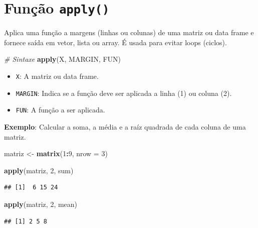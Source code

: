 \documentclass[
]{book}
\newenvironment{Shaded}{\begin{snugshade}}{\end{snugshade}}
\newcommand{\AttributeTok}[1]{\textcolor[rgb]{0.13,0.29,0.53}{#1}}
\newcommand{\CommentTok}[1]{\textcolor[rgb]{0.56,0.35,0.01}{\textit{#1}}}
\newcommand{\DecValTok}[1]{\textcolor[rgb]{0.00,0.00,0.81}{#1}}
\newcommand{\FunctionTok}[1]{\textcolor[rgb]{0.13,0.29,0.53}{\textbf{#1}}}
\newcommand{\NormalTok}[1]{#1}
\newcommand{\OtherTok}[1]{\textcolor[rgb]{0.56,0.35,0.01}{#1}}
\newcommand{\SpecialCharTok}[1]{\textcolor[rgb]{0.81,0.36,0.00}{\textbf{#1}}}
\begin{document}
\section{\texorpdfstring{Função \texttt{apply()}}{Função apply()}}\label{funuxe7uxe3o-apply}

Aplica uma função a margens (linhas ou colunas) de uma matriz ou data frame e fornece saída em vetor, lista ou array. É usada para evitar loops (ciclos).

\begin{Shaded}
\begin{Highlighting}[]
\CommentTok{\# Sintaxe}
\FunctionTok{apply}\NormalTok{(X, MARGIN, FUN)}
\end{Highlighting}
\end{Shaded}

\begin{itemize}
\item
  \texttt{X}: A matriz ou data frame.
\item
  \texttt{MARGIN}: Indica se a função deve ser aplicada a linha (1) ou coluna (2).
\item
  \texttt{FUN}: A função a ser aplicada.
\end{itemize}

\textbf{Exemplo}: Calcular a soma, a média e a raíz quadrada de cada coluna de uma matriz.

\begin{Shaded}
\begin{Highlighting}[]
\NormalTok{matriz }\OtherTok{\textless{}{-}} \FunctionTok{matrix}\NormalTok{(}\DecValTok{1}\SpecialCharTok{:}\DecValTok{9}\NormalTok{, }\AttributeTok{nrow =} \DecValTok{3}\NormalTok{)}

\FunctionTok{apply}\NormalTok{(matriz, }\DecValTok{2}\NormalTok{, sum)}
\end{Highlighting}
\end{Shaded}

\begin{verbatim}
## [1]  6 15 24
\end{verbatim}

\begin{Shaded}
\begin{Highlighting}[]
\FunctionTok{apply}\NormalTok{(matriz, }\DecValTok{2}\NormalTok{, mean)}
\end{Highlighting}
\end{Shaded}

\begin{verbatim}
## [1] 2 5 8
\end{verbatim}
\end{document}
